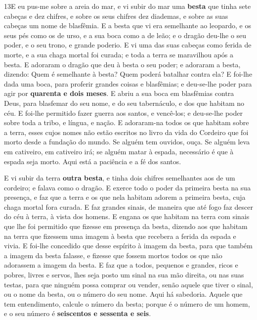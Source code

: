 \medskip

\lettrine{13} E eu pus-me sobre a areia do mar, e vi subir do
mar uma \textbf{besta} que tinha sete cabeças e dez chifres, e sobre
os seus chifres dez diademas, e sobre as suas cabeças um nome de
blasfêmia. E a besta que vi era semelhante ao leopardo, e os
seus pés como os de urso, e a sua boca como a de leão; e o dragão
deu-lhe o seu poder, e o seu trono, e grande poderio. E vi uma
das suas cabeças como ferida de morte, e a sua chaga mortal foi
curada; e toda a terra se maravilhou após a besta. E adoraram o
dragão que deu à besta o seu poder; e adoraram a besta, dizendo:
Quem é semelhante à besta? Quem poderá batalhar contra ela? E
foi-lhe dada uma boca, para proferir grandes coisas e blasfêmias; e
deu-se-lhe poder para agir por \textbf{quarenta e dois meses}. E
abriu a sua boca em blasfêmias contra Deus, para blasfemar do seu
nome, e do seu tabernáculo, e dos que habitam no céu. E foi-lhe
permitido fazer guerra aos santos, e vencê-los; e deu-se-lhe poder
sobre toda a tribo, e língua, e nação. E adoraram-na todos os
que habitam sobre a terra, esses cujos nomes não estão escritos no
livro da vida do Cordeiro que foi morto desde a fundação do mundo.
Se alguém tem ouvidos, ouça. Se alguém leva em cativeiro,
em cativeiro irá; se alguém matar à espada, necessário é que à
espada seja morto. Aqui está a paciência e a fé dos santos.

E vi subir da terra \textbf{outra besta}, e tinha dois chifres
semelhantes aos de um cordeiro; e falava como o dragão. E
exerce todo o poder da primeira besta na sua presença, e faz que a
terra e os que nela habitam adorem a primeira besta, cuja chaga
mortal fora curada. E faz grandes sinais, de maneira que até
fogo faz descer do céu à terra, à vista dos homens. E engana
os que habitam na terra com sinais que lhe foi permitido que fizesse
em presença da besta, dizendo aos que habitam na terra que fizessem
uma imagem à besta que recebera a ferida da espada e vivia. E
foi-lhe concedido que desse espírito à imagem da besta, para que
também a imagem da besta falasse, e fizesse que fossem mortos todos
os que não adorassem a imagem da besta. E faz que a todos,
pequenos e grandes, ricos e pobres, livres e servos, lhes seja posto
um sinal na sua mão direita, ou nas suas testas, para que
ninguém possa comprar ou vender, senão aquele que tiver o sinal, ou
o nome da besta, ou o número do seu nome. Aqui há sabedoria.
Aquele que tem entendimento, calcule o número da besta; porque é o
número de um homem, e o seu número é \textbf{seiscentos e sessenta e
seis}.

